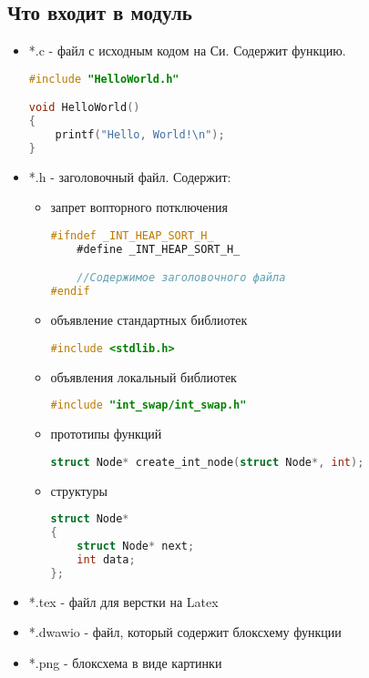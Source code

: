 \subsection{Что входит в модуль}

\begin{itemize}
    \item *.c - файл с исходным кодом на Си. Содержит функцию.
    
\begin{lstlisting}[language=C, numbers=none, caption=primer.c]
#include "HelloWorld.h"

void HelloWorld()
{
    printf("Hello, World!\n");
}
\end{lstlisting}

    \item *.h - заголовочный файл. Содержит:
    \begin{itemize}

        \item запрет вопторного потключения

\begin{lstlisting}[language=C, numbers=none, caption=primer.c]
#ifndef _INT_HEAP_SORT_H_
    #define _INT_HEAP_SORT_H_

    //Содержимое заголовочного файла    
#endif
\end{lstlisting}

        \item объявление стандартных библиотек 
    
\begin{lstlisting}[language=C, numbers=none, caption=primer.h]
#include <stdlib.h>
\end{lstlisting}

        \item объявления локальный библиотек

\begin{lstlisting}[language=C, numbers=none, caption=*.h]
#include "int_swap/int_swap.h"
\end{lstlisting}

        \item прототипы функций

\begin{lstlisting}[language=C, numbers=none, caption=primer.h]
struct Node* create_int_node(struct Node*, int);
\end{lstlisting}

        \item структуры

\begin{lstlisting}[language=C, numbers=none, caption=primer.h]
struct Node*
{
    struct Node* next;
    int data;
};
\end{lstlisting}

    \end{itemize}
    \item *.tex - файл для верстки на Latex
    \item *.dwawio - файл, который содержит блоксхему функции
    \item *.png - блоксхема в виде картинки
\end{itemize}

